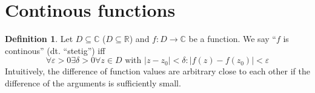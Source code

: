 \documentclass[a4paper,landscape,twocolumn]{article}
\theoremstyle{definition}
\newtheorem{defi}{Definition}
\newcommand\abs[1]{\left|#1\right|}
\begin{document}
\section{Continous functions}
\begin{defi}
  Let $D \subseteq \mathbb C$ ($D \subseteq \mathbb R$) and $f: D \rightarrow \mathbb C$
  be a function. We say \enquote{$f$ is continous} (dt. \foreignlanguage{ngerman}{\enquote{stetig}}) iff
  \[
    \forall \varepsilon > 0 \exists \delta > 0
    \forall z \in D \text{ with } \abs{z - z_0} < \delta:
    \abs{f(z) - f(z_0)} < \varepsilon
  \]
  Intuitively, the difference of function values are arbitrary close to each other
  if the difference of the arguments is sufficiently small.
\end{defi}

\end{document}
